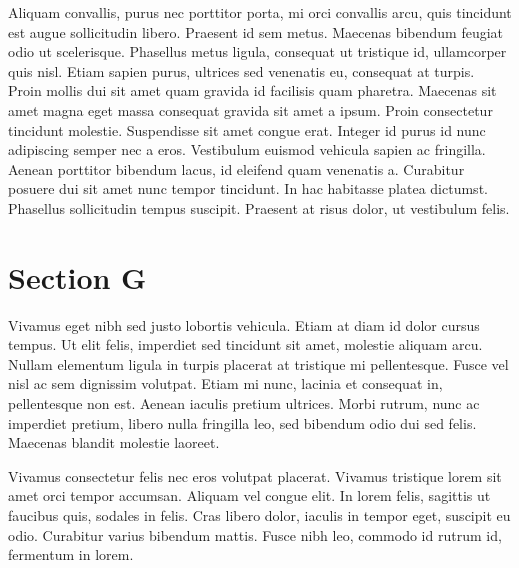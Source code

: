Aliquam convallis, purus nec porttitor porta, mi orci convallis arcu, quis tincidunt est augue sollicitudin libero. Praesent id sem metus. Maecenas bibendum feugiat odio ut scelerisque. Phasellus metus ligula, consequat ut tristique id, ullamcorper quis nisl. Etiam sapien purus, ultrices sed venenatis eu, consequat at turpis. Proin mollis dui sit amet quam gravida id facilisis quam pharetra. Maecenas sit amet magna eget massa consequat gravida sit amet a ipsum. Proin consectetur tincidunt molestie. Suspendisse sit amet congue erat. Integer id purus id nunc adipiscing semper nec a eros. Vestibulum euismod vehicula sapien ac fringilla. Aenean porttitor bibendum lacus, id eleifend quam venenatis a. Curabitur posuere dui sit amet nunc tempor tincidunt. In hac habitasse platea dictumst. Phasellus sollicitudin tempus suscipit. Praesent at risus dolor, ut vestibulum felis.

\section{Section G}
Vivamus eget nibh sed justo lobortis vehicula. Etiam at diam id dolor cursus tempus. Ut elit felis, imperdiet sed tincidunt sit amet, molestie aliquam arcu. Nullam elementum ligula in turpis placerat at tristique mi pellentesque. Fusce vel nisl ac sem dignissim volutpat. Etiam mi nunc, lacinia et consequat in, pellentesque non est. Aenean iaculis pretium ultrices. Morbi rutrum, nunc ac imperdiet pretium, libero nulla fringilla leo, sed bibendum odio dui sed felis. Maecenas blandit molestie laoreet.

Vivamus consectetur felis nec eros volutpat placerat. Vivamus tristique lorem sit amet orci tempor accumsan. Aliquam vel congue elit. In lorem felis, sagittis ut faucibus quis, sodales in felis. Cras libero dolor, iaculis in tempor eget, suscipit eu odio. Curabitur varius bibendum mattis. Fusce nibh leo, commodo id rutrum id, fermentum in lorem. 